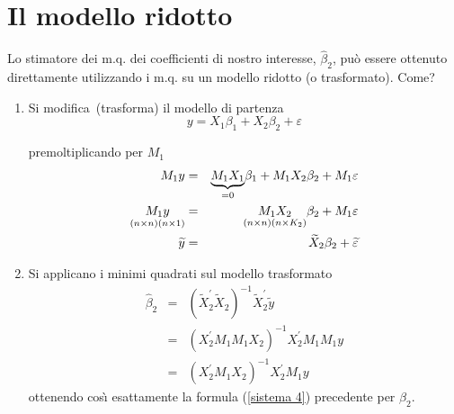 \documentclass[a4paper]{report}
\theoremstyle{remark}
\begin{document}
\section{Il modello ridotto}

Lo stimatore dei m.q. dei coefficienti di nostro interesse, $\widehat{\beta }%
_{2}$, pu\`{o} essere ottenuto direttamente utilizzando i m.q. su un modello
ridotto (o trasformato). Come?

\begin{enumerate}
\item Si modifica\ (trasforma) il modello di partenza%
\begin{equation*}
y=X_{1}\beta _{1}+X_{2}\beta _{2}+\varepsilon
\end{equation*}

premoltiplicando per $M_{1}$%
\begin{eqnarray}
M_{1}y &=&\underset{=0}{\underbrace{M_{1}X_{1}}}\beta _{1}+M_{1}X_{2}\beta
_{2}+M_{1}\varepsilon  \notag \\
\underset{\left( n\times n\right) \left( n\times 1\right) }{M_{1}y} &=&%
\underset{\left( n\times n\right) \left( n\times K_{2}\right) }{M_{1}X_{2}}%
\beta _{2}+M_{1}\varepsilon  \notag \\
\widetilde{y} &=&\widetilde{X}_{2}\beta _{2}+\widetilde{\varepsilon }
\label{sistema 5}
\end{eqnarray}

\item Si applicano i minimi quadrati sul modello trasformato%
\begin{eqnarray*}
\widehat{\beta }_{2} &=&\left( \widetilde{X}_{2}^{\prime }\widetilde{X}%
_{2}\right) ^{-1}\widetilde{X}_{2}^{\prime }\widetilde{y} \\
&=&\left( X_{2}^{\prime }M_{1}M_{1}X_{2}\right) ^{-1}X_{2}^{\prime
}M_{1}M_{1}y \\
&=&\left( X_{2}^{\prime }M_{1}X_{2}\right) ^{-1}X_{2}^{\prime }M_{1}y
\end{eqnarray*}%
ottenendo cos\`{\i} esattamente la formula (\ref{sistema 4}) precedente per $%
\widehat{\beta }_{2}$.
\end{enumerate}
\end{document}

